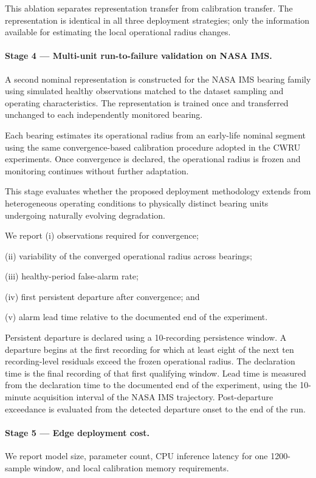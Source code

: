 \documentclass[numbered]{trbunofficial}
\begin{document}
This ablation separates representation transfer from calibration transfer.
The representation is identical in all three deployment strategies; only the
information available for estimating the local operational radius changes.

\paragraph{Stage 4 --- Multi-unit run-to-failure validation on NASA IMS.}

A second nominal representation is constructed for the NASA IMS bearing
family using simulated healthy observations matched to the dataset sampling
and operating characteristics.
The representation is trained once and transferred unchanged to each
independently monitored bearing.

Each bearing estimates its operational radius from an early-life nominal
segment using the same convergence-based calibration procedure adopted in the
CWRU experiments.
Once convergence is declared, the operational radius is frozen and monitoring
continues without further adaptation.

This stage evaluates whether the proposed deployment methodology extends from
heterogeneous operating conditions to physically distinct bearing units
undergoing naturally evolving degradation.

We report
(i) observations required for convergence;

(ii) variability of the converged operational radius across bearings;

(iii) healthy-period false-alarm rate;

(iv) first persistent departure after convergence; and

(v) alarm lead time relative to the documented end of the experiment.

\vspace{0.1cm}
Persistent departure is declared using a 10-recording persistence window.
A departure begins at the first recording for which at least eight of the
next ten recording-level residuals exceed the frozen operational radius.
The declaration time is the final recording of that first qualifying
window. Lead time is measured from the declaration time to the documented
end of the experiment, using the 10-minute acquisition interval of the NASA
IMS trajectory. Post-departure exceedance is evaluated from the detected
departure onset to the end of the run.


\paragraph{Stage 5 --- Edge deployment cost.}
We report model size, parameter count, CPU inference latency for one 1200-sample window, 
and local calibration memory requirements.
\end{document}
